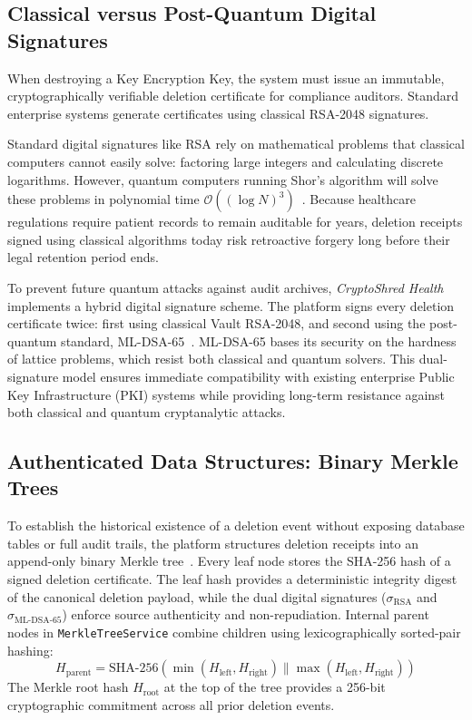 \subsection{Classical versus Post-Quantum Digital Signatures}

When destroying a Key Encryption Key, the system must issue an immutable, cryptographically verifiable deletion certificate for compliance auditors. Standard enterprise systems generate certificates using classical RSA-2048 signatures.

Standard digital signatures like RSA rely on mathematical problems that classical computers cannot easily solve: factoring large integers and calculating discrete logarithms. However, quantum computers running Shor's algorithm will solve these problems in polynomial time $\mathcal{O}((\log N)^3)$~\cite{nist_fips_204}. Because healthcare regulations require patient records to remain auditable for years, deletion receipts signed using classical algorithms today risk retroactive forgery long before their legal retention period ends.

To prevent future quantum attacks against audit archives, \textit{CryptoShred Health} implements a hybrid digital signature scheme. The platform signs every deletion certificate twice: first using classical Vault RSA-2048, and second using the post-quantum standard, ML-DSA-65~\cite{nist_fips_204}. ML-DSA-65 bases its security on the hardness of lattice problems, which resist both classical and quantum solvers. This dual-signature model ensures immediate compatibility with existing enterprise Public Key Infrastructure (PKI) systems while providing long-term resistance against both classical and quantum cryptanalytic attacks.

\subsection{Authenticated Data Structures: Binary Merkle Trees}

To establish the historical existence of a deletion event without exposing database tables or full audit trails, the platform structures deletion receipts into an append-only binary Merkle tree~\cite{merkle1989}. Every leaf node stores the SHA-256 hash of a signed deletion certificate. The leaf hash provides a deterministic integrity digest of the canonical deletion payload, while the dual digital signatures ($\sigma_{\text{RSA}}$ and $\sigma_{\text{ML-DSA-65}}$) enforce source authenticity and non-repudiation. Internal parent nodes in \texttt{MerkleTreeService} combine children using lexicographically sorted-pair hashing:
\begin{equation}
    H_{\text{parent}} = \text{SHA-256}(\min(H_{\text{left}}, H_{\text{right}}) \parallel \max(H_{\text{left}}, H_{\text{right}}))
    \label{eq:merkle-parent-node}
\end{equation}
The Merkle root hash $H_{\text{root}}$ at the top of the tree provides a 256-bit cryptographic commitment across all prior deletion events.

